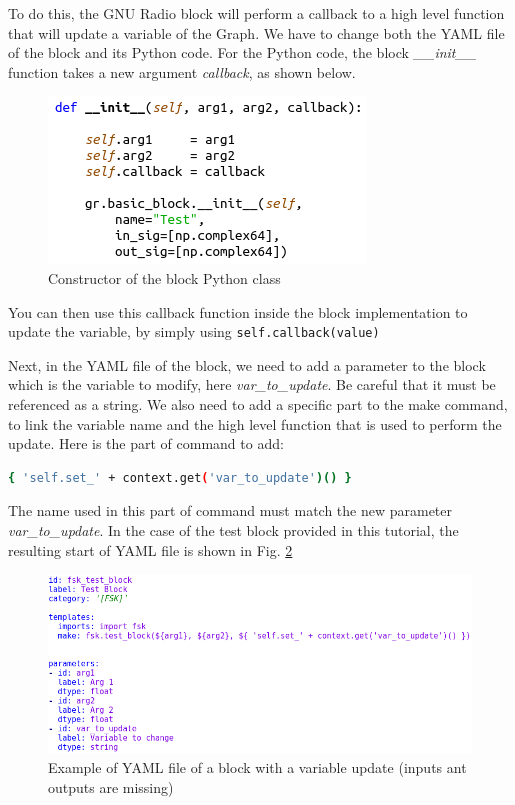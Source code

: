 To do this, the GNU Radio block will perform a callback to a high level function that will update a variable of the Graph. We have to change both the YAML file of the block and its Python code. For the Python code, the block \textit{\_\_init\_\_} function takes a new argument \textit{callback}, as shown below.

 \begin{figure}[H]
    \centering
    \includegraphics[scale=0.65, left]{figures/Callback_python.png}
    \caption{Constructor of the block Python class}
    \label{fig:callback_python}
\end{figure}

You can then use this callback function inside the block implementation to update the variable, by simply using \texttt{self.callback(value)}

Next, in the YAML file of the block, we need to add a parameter to the block which is the variable to modify, here \textit{var\_to\_update}. Be careful that it must be referenced as a string. We also need to add a specific part to the make command, to link the variable name and the high level function that is used to perform the update. Here is the part of command to add:

\begin{lstlisting}[language=bash]
    { 'self.set_' + context.get('var_to_update')() }
\end{lstlisting}

The name used in this part of command must match the new parameter \textit{var\_to\_update}. In the case of the test block provided in this tutorial, the resulting start of YAML file is shown in Fig. \ref{fig:Callback_yml}

 \begin{figure}[H]
    \centering
    \includegraphics[scale=0.45, left]{figures/Callback_yml.png}
    \caption{Example of YAML file of a block with a variable update (inputs ant outputs are missing) }
    \label{fig:Callback_yml}
\end{figure}

